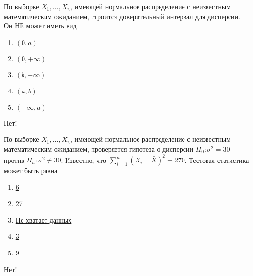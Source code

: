 \documentclass[t]{beamer}
\begin{document}
 \begin{frame} \label{40-No} 
\begin{block}{40} 

По выборке $X_1,\ldots,X_{n}$, имеющей нормальное распределение с неизвестным математическим ожиданием, строится доверительный интервал для дисперсии. Он НЕ может иметь вид


 \end{block} 
\begin{enumerate} 
\item[] \hyperlink{40-No}{\beamergotobutton{} $(0, a)$}
\item[] \hyperlink{40-No}{\beamergotobutton{} $(0, +\infty)$}
\item[] \hyperlink{40-No}{\beamergotobutton{} $(b, +\infty)$}
\item[] \hyperlink{40-No}{\beamergotobutton{} $(a, b)$}
\item[] \hyperlink{40-Yes}{\beamergotobutton{} $(-\infty, a)$}
\end{enumerate} 

 \alert{Нет!} 
\end{frame} 


 \begin{frame} \label{41-No} 
\begin{block}{41} 

По выборке $X_1,\ldots,X_{n}$, имеющей нормальное распределение с неизвестным математическим ожиданием, проверяется гипотеза о дисперсии $H_0: \sigma^2 = 30$ против $H_a: \sigma^2 \ne 30$. Известно, что $\sum_{i=1}^{n} (X_i - \bar{X})^2 = 270$. Тестовая статистика может быть равна


 \end{block} 
\begin{enumerate} 
\item[] \hyperlink{41-No}{\beamergotobutton{} 6}
\item[] \hyperlink{41-No}{\beamergotobutton{} 27}
\item[] \hyperlink{41-No}{\beamergotobutton{} Не хватает данных}
\item[] \hyperlink{41-No}{\beamergotobutton{} 3}
\item[] \hyperlink{41-Yes}{\beamergotobutton{} 9}
\end{enumerate} 

 \alert{Нет!} 
\end{frame} 
\end{document}
